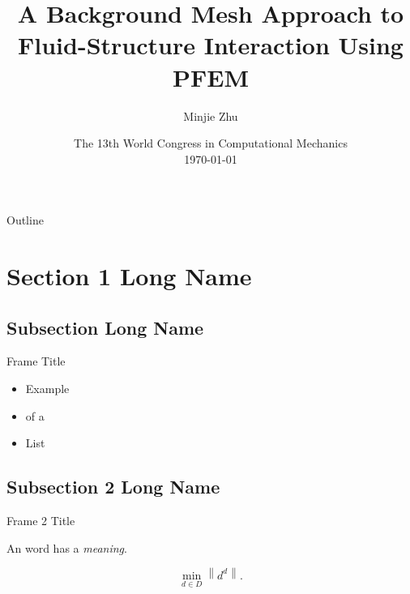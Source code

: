 \documentclass[12pt]{beamer}
\title[Background Mesh]{A Background Mesh Approach to Fluid-Structure
  Interaction Using PFEM}
\author[M.Z.]{Minjie Zhu}
\institute[OSU]{Civil \& Construction Engineering
  \begin{center}
  \end{center}
}
\date[WCCM 2018]
  {The 13th World Congress in Computational Mechanics\\   
    \today
  }
\begin{document}
\begin{frame}
  \titlepage
\end{frame}


\begin{frame}{Outline}
  \tableofcontents%
\end{frame}

\section[Short Section 1]{Section 1 Long Name}

\subsection[Short Subsection]{Subsection Long Name}

\begin{frame}{Frame Title}
  \begin{minipage}{.45\textwidth}
    \begin{itemize}
    \item Example
    \item of a
    \item List
    \end{itemize}
  \end{minipage}
\end{frame}

\subsection[Short Subsection 2]{Subsection 2 Long Name}

\begin{frame}{Frame 2 Title}
\begin{definition}An \alert{word} has a {\em meaning}.
\end{definition}
\begin{equation*}
\min_{d\in D} \left\| d^d \right\|.
\end{equation*}

\end{frame}
\end{document}
